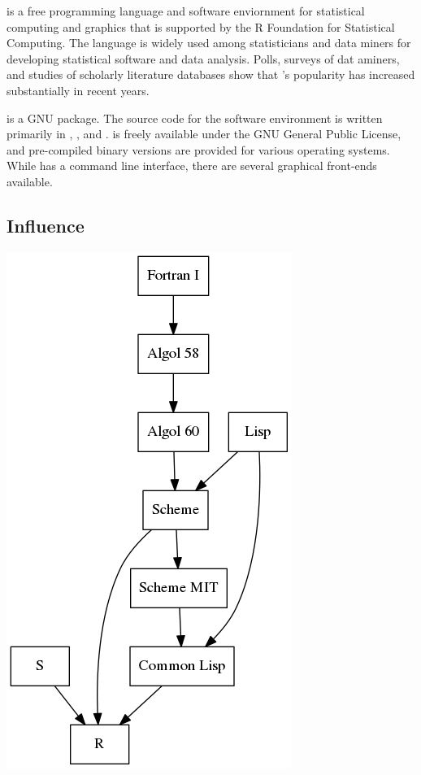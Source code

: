 \documentclass[../Languages.tex]{subfiles}
\begin{document}
\label{sec:r}

 is a free programming language and software enviornment for statistical
computing and graphics that is supported by the R Foundation for Statistical
Computing. The  language is widely used among statisticians and data
miners for developing statistical software and data analysis. Polls, surveys of
dat aminers, and studies of scholarly literature databases show that 's
popularity has increased substantially in recent years.

 is a GNU package. The source code for the  software environment is
written primarily in , , and .  is freely
available under the GNU General Public License, and pre-compiled binary
versions are provided for various operating systems. While  has a command
line interface, there are several graphical front-ends available.

\subsection{Influence}\label{sub:influence}

\begin{Figure}
  \centering
  \includegraphics[height=0.5\textheight]{r}
\end{Figure}

\newpage
\end{document}

